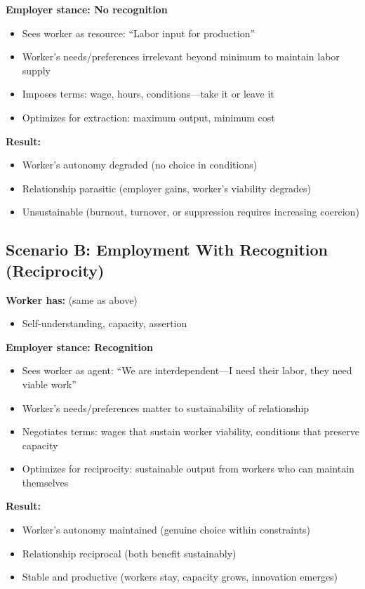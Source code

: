 \documentclass[12pt,a4paper]{article}
\begin{document}
\textbf{Employer stance: No recognition}
\begin{itemize}
    \item Sees worker as resource: ``Labor input for production''
    \item Worker's needs/preferences irrelevant beyond minimum to maintain labor supply
    \item Imposes terms: wage, hours, conditions—take it or leave it
    \item Optimizes for extraction: maximum output, minimum cost
\end{itemize}

\textbf{Result:}
\begin{itemize}
    \item Worker's autonomy degraded (no choice in conditions)
    \item Relationship parasitic (employer gains, worker's viability degrades)
    \item Unsustainable (burnout, turnover, or suppression requires increasing coercion)
\end{itemize}

\subsection{Scenario B: Employment With Recognition (Reciprocity)}

\textbf{Worker has:} (same as above)
\begin{itemize}
    \item Self-understanding, capacity, assertion
\end{itemize}

\textbf{Employer stance: Recognition}
\begin{itemize}
    \item Sees worker as agent: ``We are interdependent—I need their labor, they need viable work''
    \item Worker's needs/preferences matter to sustainability of relationship
    \item Negotiates terms: wages that sustain worker viability, conditions that preserve capacity
    \item Optimizes for reciprocity: sustainable output from workers who can maintain themselves
\end{itemize}

\textbf{Result:}
\begin{itemize}
    \item Worker's autonomy maintained (genuine choice within constraints)
    \item Relationship reciprocal (both benefit sustainably)
    \item Stable and productive (workers stay, capacity grows, innovation emerges)
\end{itemize}
\end{document}

